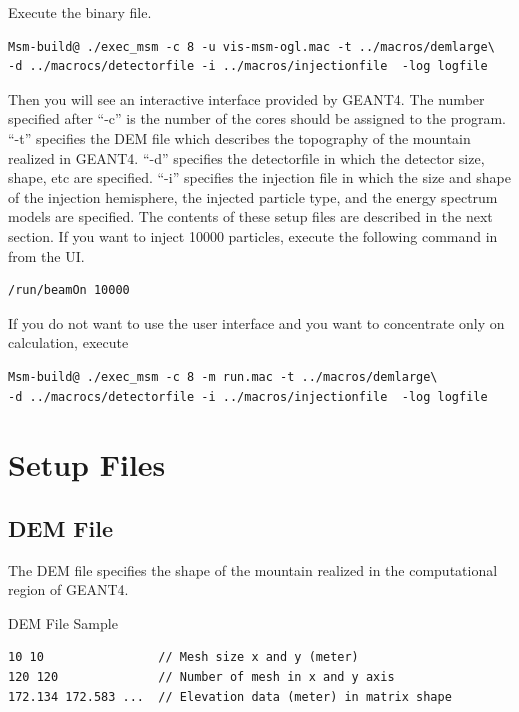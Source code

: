 \documentclass[11pt,a4paper]{jsarticle}
\begin{document}
Execute the binary file.

\begin{screen}
{\small
\begin{verbatim}
Msm-build@ ./exec_msm -c 8 -u vis-msm-ogl.mac -t ../macros/demlarge\
-d ../macrocs/detectorfile -i ../macros/injectionfile  -log logfile
\end{verbatim}}
\end{screen}

Then you will see an interactive interface provided by GEANT4. The number specified after ``-c'' is the 
number of the cores should be assigned to the program. ``-t'' specifies the DEM file which describes the 
topography of the mountain realized in GEANT4. ``-d'' specifies the detectorfile in which the detector size,
shape, etc are specified. ``-i'' specifies the injection file in which the size and shape of the injection
hemisphere, the injected particle type, and the energy spectrum models are specified. The contents of these
setup files are described in the next section. If you want to inject 10000 particles, execute the following 
command in from the UI.

\begin{screen}
{\small
\begin{verbatim}
/run/beamOn 10000
\end{verbatim}}
\end{screen}

If you do not want to use the user interface and you want to concentrate only on calculation, execute

\begin{screen}
{\small
\begin{verbatim}
Msm-build@ ./exec_msm -c 8 -m run.mac -t ../macros/demlarge\
-d ../macrocs/detectorfile -i ../macros/injectionfile  -log logfile
\end{verbatim}}
\end{screen}


\section{Setup Files}

\subsection{DEM File}
The DEM file specifies the shape of the mountain realized in the computational region 
of GEANT4. 

\begin{itembox}[c]{DEM File Sample}
{\small
\begin{verbatim}
10 10                // Mesh size x and y (meter)
120 120              // Number of mesh in x and y axis 
172.134 172.583 ...  // Elevation data (meter) in matrix shape
\end{verbatim}}
\end{itembox}
\end{document}
